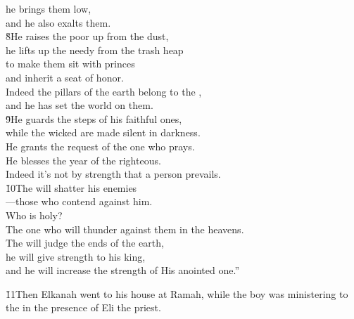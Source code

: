 \begin{poetry}
\poeml he brings them low, \\
\poemll    and he also exalts them. \\
\poeml \v{8}He raises the poor up from the dust, \\
\poemll    he lifts up the needy from the trash heap \\
\poeml to make them sit with princes \\
\poemll    and inherit a seat of honor. \\
\poeml Indeed the pillars of the earth belong to the , \\
\poemll    and he has set the world on them. \\
\poeml \v{9}He guards the steps of his faithful ones, \\
\poemll    while the wicked are made silent in darkness. \\
\poeml He grants the request of the one who prays. \\
\poemll    He blesses the year of the righteous. \\
\poeml Indeed it's not by strength that a person prevails. \\
\poeml \v{10}The  will shatter his enemies \\
\poemll    ---those who contend against him. \\
\poeml Who is holy? \\
\poemll    The one who will thunder against them in the heavens. \\
\poeml The  will judge the ends of the earth, \\
\poemll    he will give strength to his king, \\
\poemlll       and he will increase the strength of His anointed one.''
\end{poetry}

\v{11}Then Elkanah went to his house at Ramah, while the boy was ministering to the  in the presence of Eli the priest.


